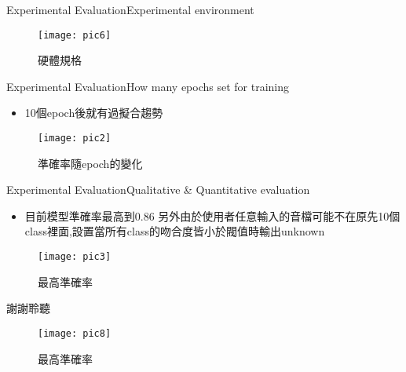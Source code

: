 \documentclass{beamer}
\begin{document}
\begin{CJK}{UTF8}{bsmi}
\begin{frame}{Experimental Evaluation}{Experimental environment}
\begin{figure}[H] %
\texttt{[image: pic6]} %
\caption{硬體規格} %
\end{figure}
\end{frame}
\begin{frame}{Experimental Evaluation}{How many epochs set for training}
  \begin{itemize}
  \item {
    10個epoch後就有過擬合趨勢
  }
  \end{itemize}
\begin{figure}[H] %
\texttt{[image: pic2]} %
\caption{準確率隨epoch的變化} %
\end{figure}
\end{frame}
\begin{frame}{Experimental Evaluation}{Qualitative \& Quantitative evaluation}
  \begin{itemize}
  \item {
    目前模型準確率最高到0.86 
另外由於使用者任意輸入的音檔可能不在原先10個class裡面,設置當所有class的吻合度皆小於閥值時輸出unknown
  }
  \end{itemize}

\begin{figure}[H] %
\texttt{[image: pic3]} %
\caption{最高準確率} %
\end{figure}
\end{frame}
\begin{frame}{謝謝聆聽}
\begin{figure}[H] %
\centering
\texttt{[image: pic8]} %
\caption{最高準確率} %
\end{figure}
\end{frame}
\end{CJK}
\end{document}
